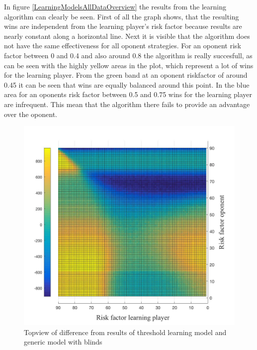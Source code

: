 \documentclass[11pt]{article}
\begin{document}
In figure \ref{LearningModelsAllDataOverview} the results from the learning algorithm can clearly be seen. First of all the graph shows, that the resulting wins are independent from the learning player's risk factor because results are nearly constant along a horizontal line. Next it is visible that the algorithm does not have the same effectiveness for all oponent strategies. For an oponent risk factor between 0 and 0.4 and also around 0.8 the algorithm is really succesfull, as can be seen with the highly yellow areas in the plot, which represent a lot of wins for the learning player. From the green band at an oponent riskfactor of around 0.45 it can be seen that wins are equally balanced around this point. In the blue area for an oponents risk factor between 0.5 and 0.75 wins for the learning player are infrequent. This mean that the algorithm there fails to provide an advantage over the oponent.\\

\begin{figure}
\begin{center}
\includegraphics[scale=.3]{Graphics/allDataWins_Threshold_Difference}
\end{center}
\caption{Topview of difference from results of threshold learning model and generic model with blinds}
\label{allDataWins_Threshold_Difference}
\end{figure}
\end{document}
